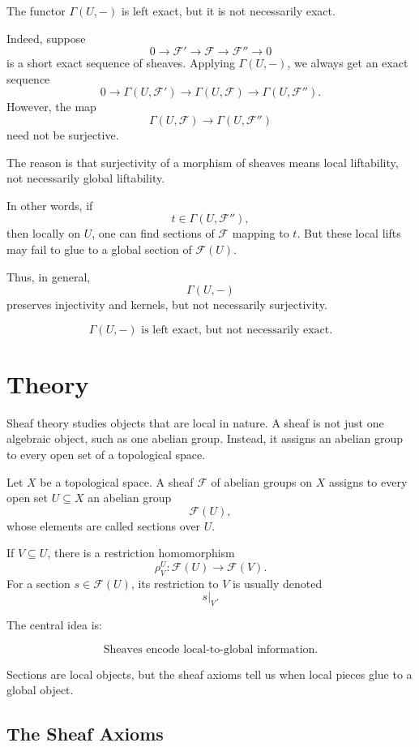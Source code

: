 \documentclass[12pt,a4paper]{article}
\newcommand{\F}{\mathcal F}
\theoremstyle{notespace}
\newcommand{\Fp}{\mathcal F'}      %
\newcommand{\Fpp}{\mathcal F''}
\begin{document}
The functor \(\Gamma(U,-)\) is left exact, but it is not necessarily exact.

Indeed, suppose
\[
0\longrightarrow \Fp
\longrightarrow \F
\longrightarrow \Fpp
\longrightarrow 0
\]
is a short exact sequence of sheaves. Applying \(\Gamma(U,-)\), we always get an exact sequence
\[
0\longrightarrow \Gamma(U,\Fp)
\longrightarrow \Gamma(U,\F)
\longrightarrow \Gamma(U,\Fpp).
\]
However, the map
\[
\Gamma(U,\F)\longrightarrow \Gamma(U,\Fpp)
\]
need not be surjective.

The reason is that surjectivity of a morphism of sheaves means local liftability, not necessarily global liftability.

In other words, if
\[
t\in \Gamma(U,\Fpp),
\]
then locally on \(U\), one can find sections of \(\F\) mapping to \(t\). But these local lifts may fail to glue to a global section of \(\F(U)\).

Thus, in general,
\[
\Gamma(U,-)
\]
preserves injectivity and kernels, but not necessarily surjectivity.

\[
\boxed{
	\Gamma(U,-)\text{ is left exact, but not necessarily exact.}
}
\]


\section{Theory}

Sheaf theory studies objects that are local in nature. A sheaf is not just one algebraic object, such as one abelian group. Instead, it assigns an abelian group to every open set of a topological space.

Let \(X\) be a topological space. A sheaf \(\F\) of abelian groups on \(X\) assigns to every open set \(U\subseteq X\) an abelian group
\[
\F(U),
\]
whose elements are called sections over \(U\).

If \(V\subseteq U\), there is a restriction homomorphism
\[
\rho^U_V:\F(U)\longrightarrow \F(V).
\]
For a section \(s\in \F(U)\), its restriction to \(V\) is usually denoted
\[
s|_V.
\]

The central idea is:

\[
\boxed{\text{Sheaves encode local-to-global information.}}
\]

Sections are local objects, but the sheaf axioms tell us when local pieces glue to a global object.

\subsection{The Sheaf Axioms}
\end{document}
